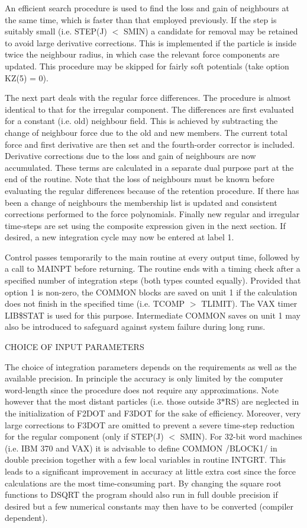  An efficient search procedure is used to find the loss and gain of
  neighbours at the same time, which is faster than that employed
  previously.  If the step is suitably small
 (i.e. STEP(J) $<$ SMIN) a candidate for removal may be retained to avoid large
 derivative corrections.  This is implemented if the particle is inside twice
 the neighbour radius, in which case the relevant force components are
 updated.  This procedure may be skipped for fairly soft potentials
 (take option KZ(5) = 0).

 The next part deals with the regular force differences.  The procedure
 is almost identical to that for the irregular component.  The
 differences are first evaluated for a constant (i.e. old) neighbour
 field.  This is
         achieved by subtracting the change of neighbour force due to the old
 and new members.  The current total force
 and first derivative are then set and the fourth-order corrector
 is included.  Derivative corrections due to the loss and gain of
 neighbours are now
 accumulated.  These terms are calculated in a separate dual purpose
 part at the end of the routine.  Note that the loss of neighbours
 must be known before evaluating the regular differences because
 of the retention procedure.  If there has been a change of neighbours the
 membership list is updated and consistent corrections performed to the force
 polynomials.  Finally new regular and irregular time-steps are set using the
 composite expression given in the next section.  If desired, a new integration
 cycle may now be entered at label 1.

 Control passes temporarily to the main routine at every output time, followed
 by a call to MAINPT before returning.  The
 routine ends with a timing check after a specified number of integration
 steps (both types counted equally).  Provided that option 1 is non-zero, the
 COMMON blocks are saved on unit 1 if the calculation does not finish in the
 specified time (i.e. TCOMP $>$ TLIMIT).  The VAX timer LIB\$STAT is used for
 this
 purpose.  Intermediate COMMON saves on unit 1 may also be introduced to
 safeguard against system failure during long runs.
\bigskip
\bigskip
\centerline {CHOICE OF INPUT PARAMETERS}
\bigskip

 The choice of integration parameters depends on the requirements as well as
 the available precision.  In principle the accuracy is only limited by the
 computer word-length since the procedure does not require any
 approximations.  Note however that the most distant particles (i.e. those
 outside 3$\ast$RS) are neglected in the initialization of F2DOT and F3DOT for
 the sake
 of efficiency.  Moreover, very large corrections to F3DOT are omitted to
 prevent
 a severe time-step reduction for the regular component (only if STEP(J) $<$
 SMIN).  For 32-bit word machines (i.e. IBM 370 and VAX) it is
 advisable to define COMMON /BLOCK1/ in double precision together with a few
 local variables in routine INTGRT.  This
 leads to a significant improvement in accuracy at little extra cost since
 the force calculations are the most time-consuming part.  By changing the
 square root functions to DSQRT the program should also run in full double
 precision if desired but a few
 numerical constants may then have to be converted (compiler dependent).


